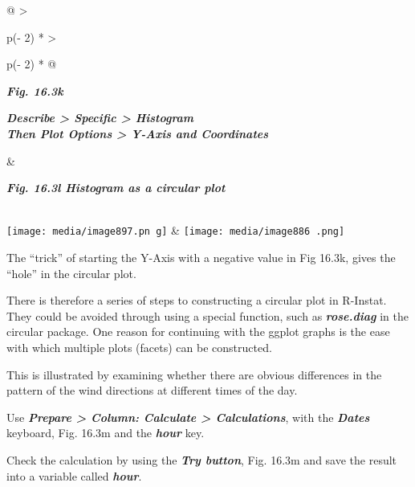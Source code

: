 \documentclass[
  letterpaper,
  DIV=11,
  numbers=noendperiod]{scrreprt}
\begin{document}
\begin{longtable}[]{@{}
  >{\raggedright\arraybackslash}p{(\columnwidth - 2\tabcolsep) * }
  >{\raggedright\arraybackslash}p{(\columnwidth - 2\tabcolsep) * }@{}}
\toprule\noalign{}
\begin{minipage}[b]{\linewidth}\raggedright
\textbf{\emph{Fig. 16.3k}}

\textbf{\emph{Describe \textgreater{} Specific \textgreater{}
Histogram\\
Then Plot Options \textgreater{} Y-Axis and Coordinates}}\strut
\end{minipage} & \begin{minipage}[b]{\linewidth}\raggedright
\textbf{\emph{Fig. 16.3l Histogram as a circular plot}}
\end{minipage} \\
\midrule\noalign{}
\endhead
\bottomrule\noalign{}
\endlastfoot
\texttt{[image: media/image897.pn g]}
&
\texttt{[image: media/image886 .png]} \\
\end{longtable}

The ``trick'' of starting the Y-Axis with a negative value in Fig 16.3k,
gives the ``hole'' in the circular plot.

There is therefore a series of steps to constructing a circular plot in
R-Instat. They could be avoided through using a special function, such
as \textbf{\emph{rose.diag}} in the circular package. One reason for
continuing with the ggplot graphs is the ease with which multiple plots
(facets) can be constructed.

This is illustrated by examining whether there are obvious differences
in the pattern of the wind directions at different times of the day.

Use \textbf{\emph{Prepare \textgreater{} Column: Calculate
\textgreater{} Calculations}}, with the \textbf{\emph{Dates}} keyboard,
Fig. 16.3m and the \textbf{\emph{hour}} key.

Check the calculation by using the \textbf{\emph{Try button}}, Fig.
16.3m and save the result into a variable called \textbf{\emph{hour}}.
\end{document}
